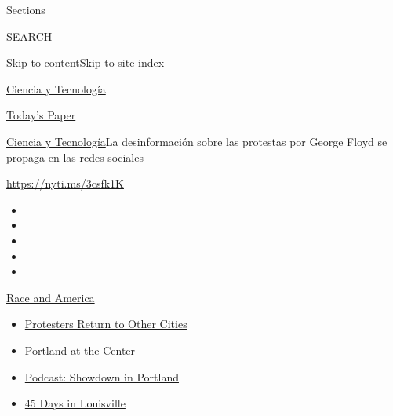 Sections

SEARCH

\protect\hyperlink{site-content}{Skip to
content}\protect\hyperlink{site-index}{Skip to site index}

\href{https://www.nytimes3xbfgragh.onion/es/section/ciencia-y-tecnologia}{Ciencia
y Tecnología}

\href{https://myaccount.nytimes3xbfgragh.onion/auth/login?response_type=cookie\&client_id=vi}{}

\href{https://www.nytimes3xbfgragh.onion/section/todayspaper}{Today's
Paper}

\href{/es/section/ciencia-y-tecnologia}{Ciencia y
Tecnología}\textbar{}La desinformación sobre las protestas por George
Floyd se propaga en las redes sociales

\url{https://nyti.ms/3csfk1K}

\begin{itemize}
\item
\item
\item
\item
\item
\end{itemize}

\href{https://www.nytimes3xbfgragh.onion/news-event/george-floyd-protests-minneapolis-new-york-los-angeles?action=click\&pgtype=Article\&state=default\&region=TOP_BANNER\&context=storylines_menu}{Race
and America}

\begin{itemize}
\tightlist
\item
  \href{https://www.nytimes3xbfgragh.onion/2020/07/26/us/protests-portland-seattle-trump.html?action=click\&pgtype=Article\&state=default\&region=TOP_BANNER\&context=storylines_menu}{Protesters
  Return to Other Cities}
\item
  \href{https://www.nytimes3xbfgragh.onion/2020/07/24/us/portland-oregon-protests-white-race.html?action=click\&pgtype=Article\&state=default\&region=TOP_BANNER\&context=storylines_menu}{Portland
  at the Center}
\item
  \href{https://www.nytimes3xbfgragh.onion/2020/07/23/podcasts/the-daily/portland-protests.html?action=click\&pgtype=Article\&state=default\&region=TOP_BANNER\&context=storylines_menu}{Podcast:
  Showdown in Portland}
\item
  \href{https://www.nytimes3xbfgragh.onion/interactive/2020/07/16/us/black-lives-matter-protests-louisville-breonna-taylor.html?action=click\&pgtype=Article\&state=default\&region=TOP_BANNER\&context=storylines_menu}{45
  Days in Louisville}
\end{itemize}

